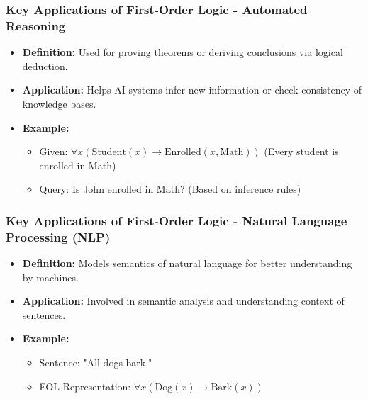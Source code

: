 \documentclass[aspectratio=169]{beamer}
\begin{document}
\begin{frame}[fragile]
    \frametitle{Key Applications of First-Order Logic - Automated Reasoning}
    \begin{itemize}
        \item \textbf{Definition:} Used for proving theorems or deriving conclusions via logical deduction.
        \item \textbf{Application:} Helps AI systems infer new information or check consistency of knowledge bases.
        \item \textbf{Example:}
            \begin{itemize}
                \item Given: $\forall x (\text{Student}(x) \rightarrow \text{Enrolled}(x, \text{Math}))$ (Every student is enrolled in Math)
                \item Query: Is John enrolled in Math? (Based on inference rules)
            \end{itemize}
    \end{itemize}
\end{frame}

\begin{frame}[fragile]
    \frametitle{Key Applications of First-Order Logic - Natural Language Processing (NLP)}
    \begin{itemize}
        \item \textbf{Definition:} Models semantics of natural language for better understanding by machines.
        \item \textbf{Application:} Involved in semantic analysis and understanding context of sentences.
        \item \textbf{Example:}
            \begin{itemize}
                \item Sentence: "All dogs bark."
                \item FOL Representation: $\forall x (\text{Dog}(x) \rightarrow \text{Bark}(x))$
            \end{itemize}
    \end{itemize}
\end{frame}
\end{document}
